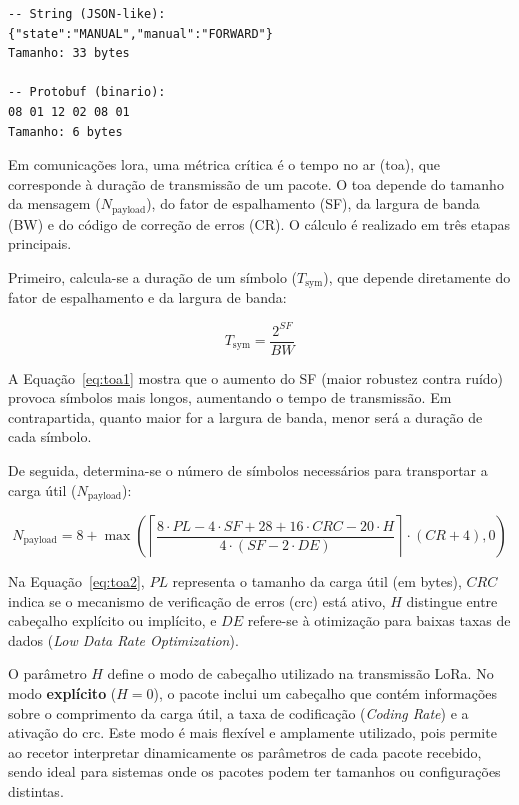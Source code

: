 \begin{lstlisting}[style={BetterCPP},caption={Comparação entre representação textual e binária com \texttt{Protobuf}},label={lst:comp}]
-- String (JSON-like):
{"state":"MANUAL","manual":"FORWARD"}
Tamanho: 33 bytes

-- Protobuf (binario):
08 01 12 02 08 01
Tamanho: 6 bytes
\end{lstlisting}

Em comunicações \gls{lora}, uma métrica crítica é o tempo no ar (\gls{toa}), que corresponde à duração de transmissão de um pacote. O \gls{toa} depende do tamanho da mensagem ($N_{\text{payload}}$), do fator de espalhamento (SF), da largura de banda (BW) e do código de correção de erros (CR). O cálculo é realizado em três etapas principais.  

Primeiro, calcula-se a duração de um símbolo ($T_{\text{sym}}$), que depende diretamente do fator de espalhamento e da largura de banda:

\begin{equation}
T_{\text{sym}} = \frac{2^{SF}}{BW}
\label{eq:toa1}
\end{equation}

A Equação~\ref{eq:toa1} mostra que o aumento do SF (maior robustez contra ruído) provoca símbolos mais longos, aumentando o tempo de transmissão. Em contrapartida, quanto maior for a largura de banda, menor será a duração de cada símbolo.  

De seguida, determina-se o número de símbolos necessários para transportar a carga útil ($N_{\text{payload}}$):

\begin{equation}
N_{\text{payload}} = 8 + \max \left( \left\lceil \frac{8 \cdot PL - 4 \cdot SF + 28 + 16 \cdot CRC - 20 \cdot H}{4 \cdot (SF - 2 \cdot DE)} \right\rceil \cdot (CR+4), 0 \right)
\label{eq:toa2}
\end{equation}

Na Equação~\ref{eq:toa2}, $PL$ representa o tamanho da carga útil (em bytes), $CRC$ indica se o mecanismo de verificação de erros (\gls{crc}) está ativo, $H$ distingue entre cabeçalho explícito ou implícito, e $DE$ refere-se à otimização para baixas taxas de dados (\emph{Low Data Rate Optimization}).  

O parâmetro $H$ define o modo de cabeçalho utilizado na transmissão LoRa.  
No modo \textbf{explícito} ($H = 0$), o pacote inclui um cabeçalho que contém informações sobre o comprimento da carga útil, a taxa de codificação (\emph{Coding Rate}) e a ativação do \gls{crc}. Este modo é mais flexível e amplamente utilizado, pois permite ao recetor interpretar dinamicamente os parâmetros de cada pacote recebido, sendo ideal para sistemas onde os pacotes podem ter tamanhos ou configurações distintas.  


